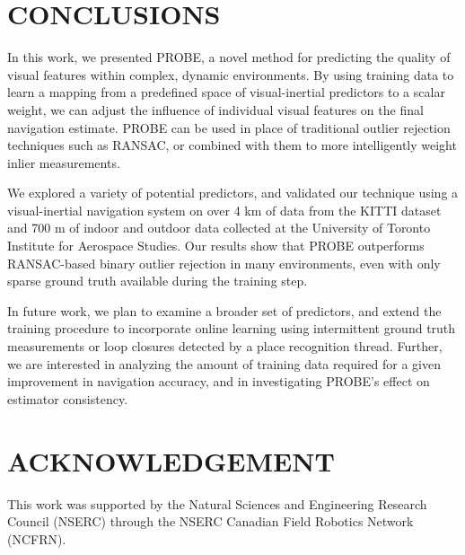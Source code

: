 \documentclass[letterpaper, 10 pt, conference]{ieeeconf}  %
\begin{document}
\section{CONCLUSIONS} \label{sec:conclusions}
In this work, we presented PROBE, a novel method for predicting the quality of visual features within complex, dynamic environments. By using training data to learn a mapping from a predefined space of visual-inertial predictors to a scalar weight, we can adjust the influence of individual visual features on the final navigation estimate. PROBE can be used in place of traditional outlier rejection techniques such as RANSAC, or combined with them to more intelligently weight inlier measurements.

We explored a variety of potential predictors, and validated our technique using a visual-inertial navigation system on over 4 km of data from the KITTI dataset and 700 m of indoor and outdoor data collected at the University of Toronto Institute for Aerospace Studies.
Our results show that PROBE outperforms RANSAC-based binary outlier rejection in many environments, even with only sparse ground truth available during the training step.

In future work, we plan to examine a broader set of predictors, and extend the training procedure to incorporate online learning using intermittent ground truth measurements or loop closures detected by a place recognition thread. Further, we are interested in analyzing the amount of training data required for a given improvement in navigation accuracy, and in investigating PROBE's effect on estimator consistency.

\section*{ACKNOWLEDGEMENT}
This work was supported by the Natural Sciences and Engineering Research Council (NSERC) through the NSERC Canadian Field Robotics Network (NCFRN).

\def\url#1{} %


\end{document}

